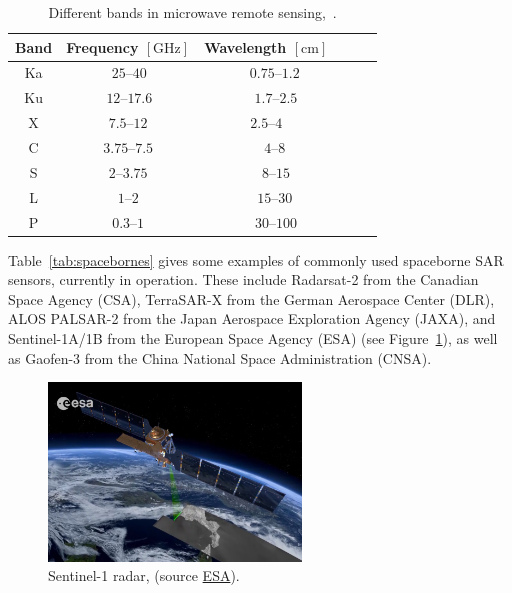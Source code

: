 \setlength{\tabcolsep}{6.0pt}
\begin{table}[!htb]
\caption[Different bands in microwave remote sensing]{\label{tab:bands}Different bands in microwave remote sensing,~\citep{Moreira2013}.}
\centering
\begin{tabular}[t]{cccccc}
\toprule
 \textbf{Band} & \multicolumn{1}{c}{\textbf{Frequency} $\left[\text{GHz}\right]$} & \multicolumn{1}{c}{\textbf{Wavelength} $\left[\text{cm}\right]$} \\
\midrule
Ka & $\,25$--$40$ & $\phantom{-}0.75$--$1.2$ \\
Ku & $\,12$--$17.6$ & $\phantom{-}\,1.7$--$2.5$ \\
X  & $7.5$--$12$  & $2.5$--$4$   \\
C  & $ 3.75$--$7.5$ & $\phantom{-}4$--$8$   \\
S  & $2$--$3.75$   & $\phantom{-}\,8$--$15$    \\
L  & $1$--$2$   & $\phantom{-}15$--$30$   \\
P  & $0.3$--$1$ & $\phantom{-}\,30$--$100$  \\
\bottomrule
\end{tabular}
\end{table}
Table~\ref{tab:spacebornes} gives some examples of commonly used spaceborne SAR sensors, currently in operation. 
These include Radarsat-2 from the Canadian Space Agency (CSA), TerraSAR-X from the German Aerospace Center (DLR), ALOS PALSAR-2 from the Japan Aerospace Exploration Agency (JAXA), and Sentinel-1A/1B from the European Space Agency (ESA) (see Figure~\ref{fig:Sentinel-1}), as well as Gaofen-3 from the China National Space Administration (CNSA).
\begin{figure}[H]
    \centering
    \includegraphics[width=0.6\textwidth]{../../Images/PNG/ESA_radar.png}
    \caption[Sentinel-1 radar.]{Sentinel-1 radar, (source \href{https://www.esa.int/Applications/Observing_the_Earth/Copernicus/Sentinel-1/Changing_lands}{ESA}).}
    \label{fig:Sentinel-1}
\end{figure}


